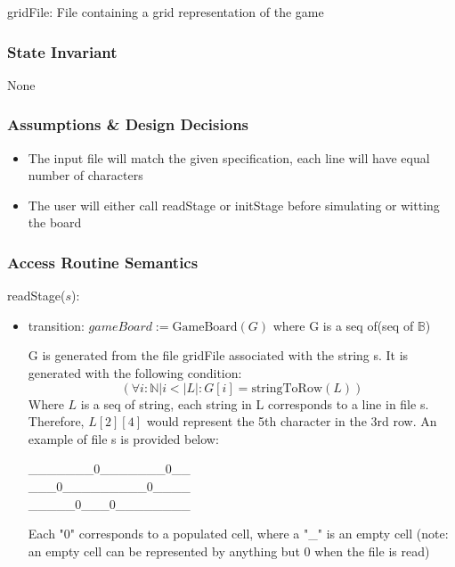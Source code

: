\documentclass[12pt]{article}
\begin{document}
gridFile: File containing a grid representation of the game

\subsubsection* {State Invariant}

None

\subsubsection* {Assumptions \& Design Decisions}

\begin{itemize}
    \item The input file will match the given specification, each line will have equal number of characters
    \item The user will either call readStage or initStage before simulating or witting the board
\end{itemize}

\newpage


\subsubsection* {Access Routine Semantics}

\noindent readStage($s$):
\begin{itemize}
\item transition: $gameBoard := \text{GameBoard}(G)$ where G is a seq of(seq of $\mathbb{B}$)

    G is generated from the file gridFile associated with the string s.
    It is generated with the following condition:
    \begin{equation*}
        (\forall i: \mathbb{N} | i < |L| : G[i] = \text{stringToRow}(L))
    \end{equation*}
    Where $L$ is a seq of string, each string in L corresponds to a line in file s.
    Therefore, $L[2][4]$ would represent the 5th character in the 3rd row.
    An example of file s is provided below:
    \begin{center}
        \_\_\_\_\_\_\_0\_\_\_\_\_\_\_0\_\_ \\
        \_\_\_0\_\_\_\_\_\_\_\_\_0\_\_\_\_ \\
        \_\_\_\_\_0\_\_\_0\_\_\_\_\_\_\_\_ \\
    \end{center}
    Each "0" corresponds to a populated cell, where a "\_" is an empty cell
    (note: an empty cell can be represented by anything but 0 when the file is read)
\end{itemize}
\end{document}
